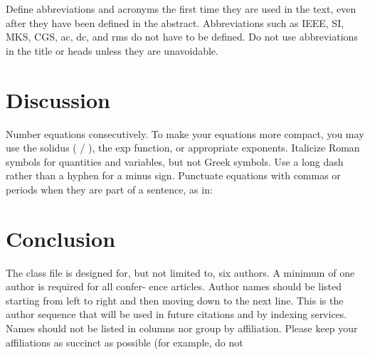 \documentclass[conference]{IEEEtran}
\begin{document}
	Define abbreviations and acronyms the first time they are
	used in the text, even after they have been defined in the
	abstract. Abbreviations such as IEEE, SI, MKS, CGS, ac, dc,
	and rms do not have to be defined. Do not use abbreviations
	in the title or heads unless they are unavoidable.
	
	\section{Discussion}
	
	Number equations consecutively. To make your equations
	more compact, you may use the solidus ( / ), the exp
	function, or appropriate exponents. Italicize Roman symbols
	for quantities and variables, but not Greek symbols. Use a
	long dash rather than a hyphen for a minus sign. Punctuate
	equations with commas or periods when they are part of a
	sentence, as in:
	
	\section{Conclusion}
	
	The class file is designed for, but not limited to, six
	authors. A minimum of one author is required for all confer-
	ence articles. Author names should be listed starting from left
	to right and then moving down to the next line. This is the
	author sequence that will be used in future citations and by
	indexing services. Names should not be listed in columns nor
	group by affiliation. Please keep your affiliations as succinct as
	possible (for example, do not


	
\end{document}
